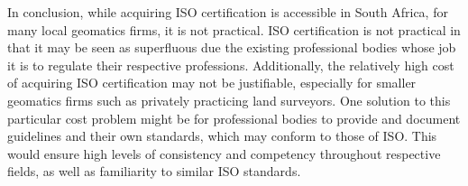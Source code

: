 \documentclass[11pt,a4paper]{article}
\begin{document}
\vspace{5mm}

In conclusion, while acquiring ISO certification is accessible in South Africa, for many local geomatics firms, it is not practical. ISO certification is not practical in that it may be seen as superfluous due the existing professional bodies whose job it is to regulate their respective professions. Additionally, the relatively high cost of acquiring ISO certification may not be justifiable, especially for smaller geomatics firms such as privately practicing land surveyors. One solution to this particular cost problem might be for professional bodies to provide and document guidelines and their own standards, which may conform to those of ISO. This would ensure high levels of consistency and competency throughout respective fields, as well as familiarity to similar ISO standards.

\newpage
\printbibliography
\end{document}
